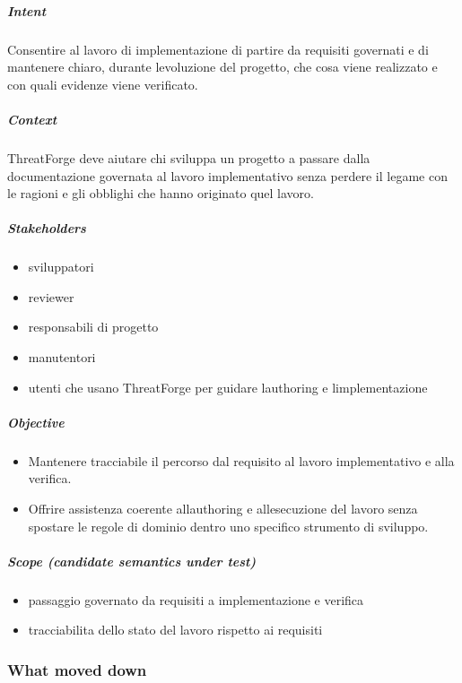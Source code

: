 \documentclass[
  10pt,
]{article}
\providecommand{\tightlist}{%
  \setlength{\itemsep}{0pt}\setlength{\parskip}{0pt}}
\begin{document}
\subparagraph{Intent}\label{intent-3}

Consentire al lavoro di implementazione di partire da requisiti
governati e di mantenere chiaro, durante l\textquotesingle evoluzione
del progetto, che cosa viene realizzato e con quali evidenze viene
verificato.

\subparagraph{Context}\label{context-3}

ThreatForge deve aiutare chi sviluppa un progetto a passare dalla
documentazione governata al lavoro implementativo senza perdere il
legame con le ragioni e gli obblighi che hanno originato quel lavoro.

\subparagraph{Stakeholders}\label{stakeholders-1}

\begin{itemize}
\tightlist
\item
  sviluppatori
\item
  reviewer
\item
  responsabili di progetto
\item
  manutentori
\item
  utenti che usano ThreatForge per guidare l\textquotesingle authoring e
  l\textquotesingle implementazione
\end{itemize}

\subparagraph{Objective}\label{objective-1}

\begin{itemize}
\tightlist
\item
  Mantenere tracciabile il percorso dal requisito al lavoro
  implementativo e alla verifica.
\item
  Offrire assistenza coerente all\textquotesingle authoring e
  all\textquotesingle esecuzione del lavoro senza spostare le regole di
  dominio dentro uno specifico strumento di sviluppo.
\end{itemize}

\subparagraph{Scope (candidate semantics under
test)}\label{scope-candidate-semantics-under-test-1}

\begin{itemize}
\tightlist
\item
  passaggio governato da requisiti a implementazione e verifica
\item
  tracciabilita dello stato del lavoro rispetto ai requisiti
\end{itemize}

\subsubsection{What moved down}\label{what-moved-down-1}
\end{document}
